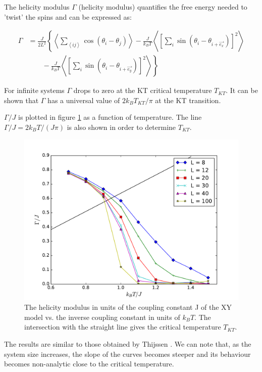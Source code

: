 \documentclass[twoside]{article}
\def\mean#1{\left< #1 \right>}
\begin{document}
\begin{multicols}{2}
The helicity modulus $\Gamma$ (helicity modulus) quantifies the free energy needed to 'twist' the spins and can be expressed as:

\begin{align}
\Gamma &= \frac{J}{2L^2}\left\{ \mean{\sum_{\mean{ij}} \cos(\theta_i - \theta_j)} - \frac{J}{k_B T} \mean{\left[ \sum_i \sin( \theta_i - \theta_{i+ \vec{e_x}}) \right]^2}\right.\nonumber \\
 &\qquad \left. {}  - \frac{J}{k_B T} \mean{\left[ \sum_i \sin( \theta_i - \theta_{i+ \vec{e_y}}) \right]^2} \right\}
\end{align}

For infinite systems $\Gamma$ drops to zero at the KT critical temperature $T_{KT}$. It can be shown \cite{thijssen} that  $\Gamma$ has a universal value of $2k_B T_{KT}/\pi$ at the KT transition.

$\Gamma/J$ is plotted in figure \ref{helicity_modulus_fig} as a function of temperature. The line $ \Gamma/J = 2k_B T/(J \pi)$ is also shown in order to determine $T_{KT}$.

\begin{figure}[H]
\centering
\includegraphics[scale=0.4]{images/helicity_modulus.pdf}
\caption{The helicity modulus in units of the coupling constant J of the XY model vs. the inverse coupling constant in units of $k_B T$. The intersection with the straight line gives the critical temperature $T_{KT}$.}
\label{helicity_modulus_fig}
\end{figure}

The results are similar to those obtained by Thijssen \cite{thijssen}. We can note that, as the system size increases, the slope of the curves becomes steeper and its behaviour becomes non-analytic close to the critical temperature.


\end{multicols}
\end{document}
